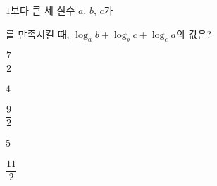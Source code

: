 $1$보다 큰 세 실수 $a$, $b$, $c$가 \par\smallskip{}\par\smallskip\noindent 를 만족시킬 때, $\log_a b+\log_b c+\log_c a$의 값은?
\begin{choices32}{\rule[-3ex]{0pt}{8ex}$\dfrac{7}{2}$}{\rule[-3ex]{0pt}{8ex}$4$}{\rule[-3ex]{0pt}{8ex}$\dfrac{9}{2}$}{\rule[-3ex]{0pt}{8ex}$5$}{\rule[-3ex]{0pt}{8ex}$\dfrac{11}{2}$}\end{choices32}

